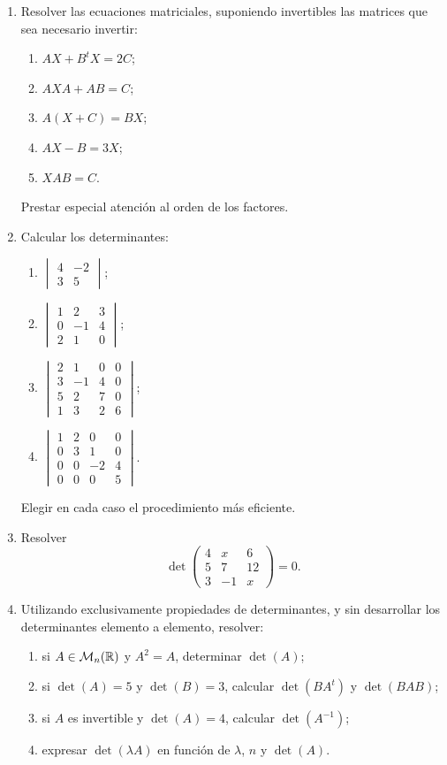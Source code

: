 \begin{enumerate}[label=\textbf{\arabic*.},leftmargin=*]
\item Resolver las ecuaciones matriciales, suponiendo invertibles las matrices que sea necesario invertir:
\begin{enumerate}[label=\alph*)]
\item $AX+B^tX=2C$;
\item $AXA+AB=C$;
\item $A(X+C)=BX$;
\item $AX-B=3X$;
\item $XAB=C$.
\end{enumerate}
Prestar especial atención al orden de los factores.

\item Calcular los determinantes:
\begin{enumerate}[label=\alph*)]
\item $\begin{vmatrix}4&-2\\3&5\end{vmatrix}$;
\item $\begin{vmatrix}1&2&3\\0&-1&4\\2&1&0\end{vmatrix}$;
\item $\begin{vmatrix}2&1&0&0\\3&-1&4&0\\5&2&7&0\\1&3&2&6\end{vmatrix}$;
\item $\begin{vmatrix}1&2&0&0\\0&3&1&0\\0&0&-2&4\\0&0&0&5\end{vmatrix}$.
\end{enumerate}
Elegir en cada caso el procedimiento más eficiente.

\item Resolver
\[
\det\begin{pmatrix}
4&x&6\\
5&7&12\\
3&-1&x
\end{pmatrix}=0.
\]

\item Utilizando exclusivamente propiedades de determinantes, y sin desarrollar los determinantes elemento a elemento, resolver:
\begin{enumerate}[label=\alph*)]
\item si $A\in\mathcal M_n(\mathbb{R})$ y $A^2=A$, determinar $\det(A)$;
\item si $\det(A)=5$ y $\det(B)=3$, calcular $\det(BA^t)$ y $\det(BAB)$;
\item si $A$ es invertible y $\det(A)=4$, calcular $\det(A^{-1})$;
\item expresar $\det(\lambda A)$ en función de $\lambda$, $n$ y $\det(A)$.
\end{enumerate}


\end{enumerate}
